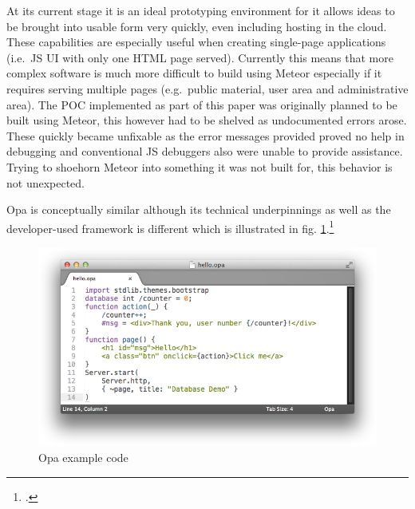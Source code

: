 \begin{appendices}
\begin{subappendices}
At its current stage it is an ideal prototyping environment for it allows ideas to be brought into usable form very quickly, even including hosting in the cloud. These capabilities are especially useful when creating single-page applications (i.e.\ JS UI with only one HTML page served). Currently this means that more complex software is much more difficult to build using Meteor especially if it requires serving multiple pages (e.g.\ public material, user area and administrative area). The POC implemented as part of this paper was originally planned to be built using Meteor, this however had to be shelved as undocumented errors arose. These quickly became unfixable as the error messages provided proved no help in debugging and conventional JS debuggers also were unable to provide assistance.
Trying to shoehorn Meteor into something it was not built for, this behavior is not unexpected.

Opa is conceptually similar although its technical underpinnings as well as the developer-used framework is different which is illustrated in fig. \ref{img:opa}.\footcite{opa}

\begin{figure}[hbtp]
\centering
\includegraphics[scale=0.5]{img/hello-opa-write}
\caption{Opa example code \label{img:opa}}
\end{figure}




\FloatBarrier 

\label{app:benchmark_results}


\end{subappendices}
\end{appendices}
